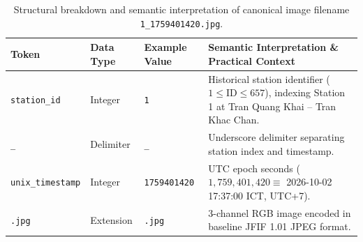 \documentclass[preprint,12pt]{elsarticle}
\begin{document}
\begin{table}[!htbp]
\centering
\small
\caption{Structural breakdown and semantic interpretation of canonical image filename \texttt{1\_1759401420.jpg}.}
\label{tab:filename_breakdown}
\begin{tabularx}{\columnwidth}{@{} l l l X @{}}
\toprule
\textbf{Token} & \textbf{Data Type} & \textbf{Example Value} & \textbf{Semantic Interpretation \& Practical Context} \\
\midrule
\texttt{station\_id} & Integer & \texttt{1} & Historical station identifier ($1 \le \text{ID} \le 657$), indexing Station 1 at Tran Quang Khai -- Tran Khac Chan. \\
\texttt{\_} & Delimiter & \texttt{\_} & Underscore delimiter separating station index and timestamp. \\
\texttt{unix\_timestamp} & Integer & \texttt{1759401420} & UTC epoch seconds ($1,759,401,420 \equiv$ 2026-10-02 17:37:00 ICT, UTC+7). \\
\texttt{.jpg} & Extension & \texttt{.jpg} & 3-channel RGB image encoded in baseline JFIF 1.01 JPEG format. \\
\bottomrule
\end{tabularx}
\end{table} 
\end{document}
